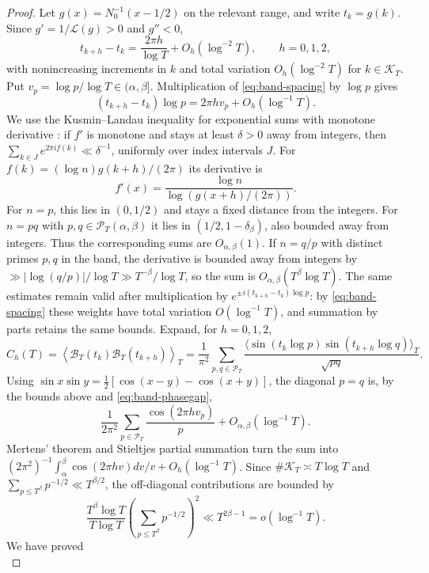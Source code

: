\documentclass[11pt,leqno]{amsart}
\numberwithin{equation}{section}
\theoremstyle{definition}
\theoremstyle{remark}
\newcommand{\1}{\mathbf 1}
\begin{document}
\begin{proof}
Let $g(x)=N_0^{-1}(x-1/2)$ on the relevant range, and write $t_k=g(k)$. Since $g'=1/\mathcal L(g)>0$ and $g''<0$,
\begin{equation}\label{eq:band-spacing}
 t_{k+h}-t_k=\frac{2\pi h}{\log T}+O_h(\log^{-2}T),\qquad h=0,1,2,
\end{equation}
with nonincreasing increments in $k$ and total variation $O_h(\log^{-2}T)$ for $k\in\mathscr K_T$. Put $v_p=\log p/\log T\in(\alpha,\beta]$. Multiplication of \eqref{eq:band-spacing} by $\log p$ gives
\begin{equation}\label{eq:band-phasegap}
 (t_{k+h}-t_k)\log p=2\pi hv_p+O_h(\log^{-1}T).
\end{equation}
We use the Kusmin--Landau inequality for exponential sums with monotone derivative \cite{GK}: if $f'$ is monotone and stays at least $\delta>0$ away from integers, then $\sum_{k\in J}e^{2\pi if(k)}\ll\delta^{-1}$, uniformly over index intervals $J$. For $f(k)=(\log n)g(k+h)/(2\pi)$ its derivative is
\[
 f'(x)=\frac{\log n}{\log(g(x+h)/(2\pi))}.
\]
For $n=p$, this lies in $(0,1/2)$ and stays a fixed distance from the integers. For $n=pq$ with $p,q\in\mathscr P_T(\alpha,\beta)$ it lies in $(1/2,1-\delta_\beta)$, also bounded away from integers. Thus the corresponding sums are $O_{\alpha,\beta}(1)$. If $n=q/p$ with distinct primes $p,q$ in the band, the derivative is bounded away from integers by $\gg|\log(q/p)|/\log T\gg T^{-\beta}/\log T$, so the sum is $O_{\alpha,\beta}(T^\beta\log T)$. The same estimates remain valid after multiplication by $e^{\pm i(t_{k+h}-t_k)\log p}$: by \eqref{eq:band-spacing} these weights have total variation $O(\log^{-1}T)$, and summation by parts retains the same bounds.
Expand, for $h=0,1,2$,
\[
 C_h(T)=\left\langle\mathscr B_T(t_k)\mathscr B_T(t_{k+h})\right\rangle_T
 =\frac1{\pi^2}\sum_{p,q\in\mathscr P_T}\frac{\langle\sin(t_k\log p)\sin(t_{k+h}\log q)\rangle_T}{\sqrt{pq}}.
\]
Using $\sin x\sin y=\frac12[\cos(x-y)-\cos(x+y)]$, the diagonal $p=q$ is, by the bounds above and \eqref{eq:band-phasegap},
\[
 \frac1{2\pi^2}\sum_{p\in\mathscr P_T}\frac{\cos(2\pi hv_p)}p+O_{\alpha,\beta}(\log^{-1}T).
\]
Mertens' theorem and Stieltjes partial summation turn the sum into $(2\pi^2)^{-1}\int_\alpha^\beta\cos(2\pi hv)dv/v+O_h(\log^{-1}T)$. Since $\#\mathscr K_T\asymp T\log T$ and $\sum_{p\le T^\beta}p^{-1/2}\ll T^{\beta/2}$, the off-diagonal contributions are bounded by
\[
 \frac{T^\beta\log T}{T\log T}
 \left(\sum_{p\le T^\beta}p^{-1/2}\right)^2
 \ll T^{2\beta-1}=o(\log^{-1}T).
\]
We have proved
\begin{equation}\label{eq:band-Ch}

\end{equation}
\end{proof}
\end{document}
